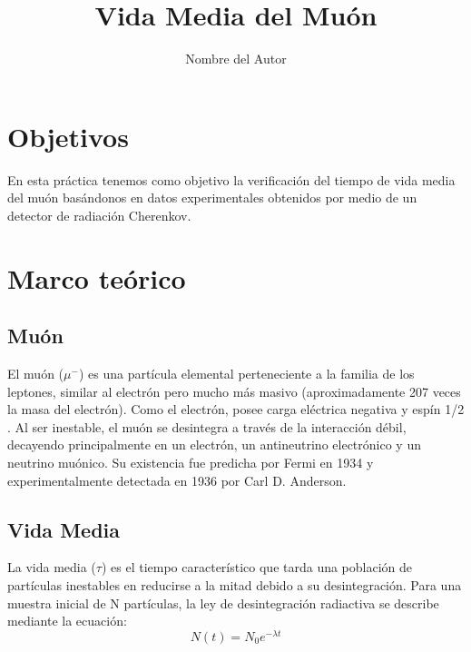 \documentclass[twocolumn,a4paper,11pt]{scrartcl}
\title{Vida Media del Muón}
\author{Nombre del Autor}
\date{}
\begin{document}

\section{Objetivos}
En esta práctica tenemos como objetivo la verificación del tiempo de vida media del muón basándonos en datos experimentales obtenidos por medio de un detector de radiación Cherenkov.

\section{Marco teórico}

\subsection*{Muón}
El muón ($\mu^-$) es una partícula elemental perteneciente a la familia de los leptones, similar al electrón pero mucho más masivo (aproximadamente 207 veces la masa del electrón). Como el electrón, posee carga eléctrica negativa y espín 1/2 \cite{Martin2010} \cite{WikipediaMuon}. Al ser inestable, el muón se desintegra a través de la interacción débil, decayendo principalmente en un electrón, un antineutrino electrónico y un neutrino muónico.  Su existencia fue predicha por Fermi en 1934 y experimentalmente detectada en 1936 por Carl D. Anderson.

\subsection*{Vida Media}
La vida media ($\tau$) es el tiempo característico que tarda una población de partículas inestables en reducirse a la mitad debido a su desintegración. Para una muestra inicial de N partículas, la ley de desintegración radiactiva se describe mediante la ecuación:
\begin{equation}
  \label{eq:exponencial}
  N(t) = N_0 e^{- \lambda t }
\end{equation}
\end{document}
